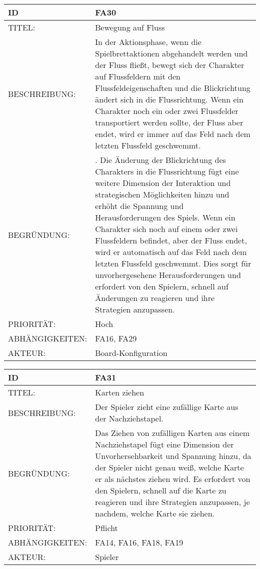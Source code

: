 \documentclass{uulm-assignment}
\begin{document}
    \begin{tabularx}{\textwidth}{|l|X |} \hline
        \textbf{ID} & \textbf{FA30} \\
        \hline
        TITEL: & Bewegung auf Fluss\\
        \hline
        BESCHREIBUNG: & In der Aktionsphase, wenn die Spielbrettaktionen abgehandelt werden
und der Fluss fließt, bewegt sich der Charakter auf Flussfeldern mit den Flussfeldeigenschaften und die Blickrichtung ändert sich in die Flussrichtung. Wenn ein Charakter noch ein oder zwei Flussfelder transportiert werden sollte, der Fluss aber
endet, wird er immer auf das Feld nach dem letzten Flussfeld geschwemmt.
        \\
        \hline
        BEGRÜNDUNG: & . Die Änderung der Blickrichtung des Charakters in die Flussrichtung fügt eine weitere Dimension der Interaktion und strategischen Möglichkeiten hinzu und erhöht die Spannung und Herausforderungen des Spiels.
Wenn ein Charakter sich noch auf einem oder zwei Flussfeldern befindet, aber der Fluss endet, wird er automatisch auf das Feld nach dem letzten Flussfeld geschwemmt. Dies sorgt für unvorhergesehene Herausforderungen und erfordert von den Spielern, schnell auf Änderungen zu reagieren und ihre Strategien anzupassen.\\
        \hline
        PRIORITÄT: & Hoch\\
        \hline
        ABHÄNGIGKEITEN: & FA16, FA29\\
        \hline
        AKTEUR: & Board-Konfiguration \\
        \hline
    \end{tabularx}
    
    \begin{tabularx}{\textwidth}{|l|X |} \hline
        \textbf{ID} & \textbf{FA31} \\
        \hline
        TITEL: & Karten ziehen\\
        \hline
        BESCHREIBUNG: & Der Spieler zieht eine zufällige Karte aus der Nachziehstapel.
        \\
        \hline
        BEGRÜNDUNG: & Das Ziehen von zufälligen Karten aus einem Nachziehstapel fügt eine Dimension der Unvorhersehbarkeit und Spannung hinzu, da der Spieler nicht genau weiß, welche Karte er als nächstes ziehen wird. Es erfordert von den Spielern, schnell auf die Karte zu reagieren und ihre Strategien anzupassen, je nachdem, welche Karte sie ziehen.\\
        \hline
        PRIORITÄT: & Pflicht\\
        \hline
        ABHÄNGIGKEITEN: & FA14, FA16, FA18, FA19\\
        \hline
        AKTEUR: & Spieler \\
        \hline
    \end{tabularx}
    
\end{document}
